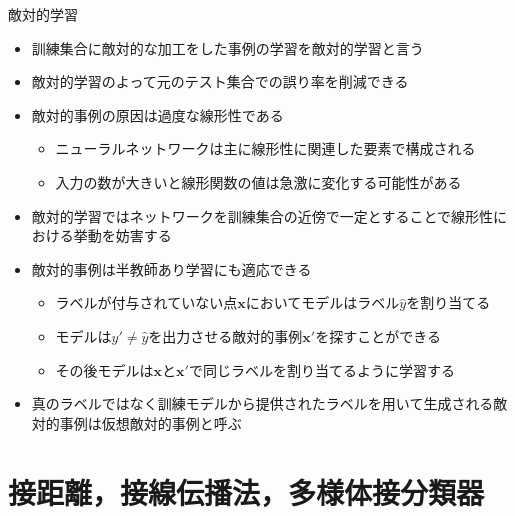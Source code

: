 \documentclass[dvipdfmx, 10pt]{beamer}
\begin{document}
\begin{frame}{敵対的学習}
  \begin{itemize}
    \item 訓練集合に敵対的な加工をした事例の学習を\alert{敵対的学習}と言う
    \item 敵対的学習のよって元のテスト集合での誤り率を削減できる
    \item 敵対的事例の原因は過度な線形性である
    \begin{itemize}
      \item ニューラルネットワークは主に線形性に関連した要素で構成される
      \item 入力の数が大きいと線形関数の値は急激に変化する可能性がある
    \end{itemize}
    \item 敵対的学習ではネットワークを訓練集合の近傍で一定とすることで線形性における挙動を妨害する
    \item 敵対的事例は半教師あり学習にも適応できる
    \begin{itemize}
      \item ラベルが付与されていない点$\bm{x}$においてモデルはラベル$\hat{y}$を割り当てる
      \item モデルは$y' \neq \hat{y}$を出力させる敵対的事例$\bm{x}'$を探すことができる
      \item その後モデルは$\bm{x}$と$\bm{x}'$で同じラベルを割り当てるように学習する
    \end{itemize}
    \item 真のラベルではなく訓練モデルから提供されたラベルを用いて生成される敵対的事例は\alert{仮想敵対的事例}と呼ぶ
  \end{itemize}
\end{frame}


\section{接距離，接線伝播法，多様体接分類器}

\end{document}
